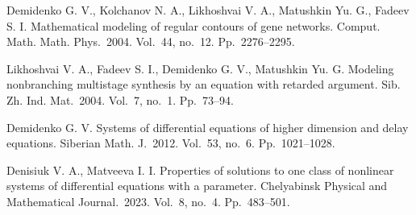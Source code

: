 \documentclass[12pt]{llncs}
\begin{document}

\begin{thebibliography}{3} %
 Demidenko G. V., Kolchanov N. A., Likhoshvai V. A., Matushkin Yu. G., Fadeev S. I. Mathematical modeling of regular contours of gene networks. Comput. Math. Math. Phys.~2004. Vol.~44, no.~12. Pp.~2276--2295.

  Likhoshvai V. A., Fadeev S. I., Demidenko G. V., Matushkin Yu. G. Modeling nonbranching multistage synthesis by an equation with retarded argument. Sib. Zh. Ind. Mat.~2004. Vol.~7,  no.~1. Pp.~73--94.

 Demidenko G. V. Systems of differential equations of higher dimension and delay equations. Siberian Math. J.~2012. Vol.~53, no.~6. Pp.~1021--1028.

 Denisiuk V. A., Matveeva I. I. Properties of solutions to one class of nonlinear systems of differential equations with a parameter. Chelyabinsk Physical and Mathematical Journal.~2023. Vol.~8, no.~4. Pp.~483--501.

\end{thebibliography}





 
\end{document}
